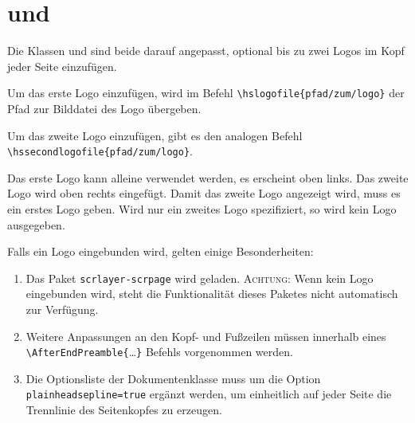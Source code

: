 \section{\HSKLarticle und \HSKLreport}
Die Klassen \HSKLarticle und \HSKLreport sind beide darauf angepasst,
optional bis zu zwei Logos im Kopf jeder Seite einzufügen.

Um das erste Logo einzufügen, wird im Befehl
\verb!\hslogofile{pfad/zum/logo}! der Pfad zur Bilddatei des Logo übergeben.

Um das zweite Logo einzufügen, gibt es den analogen Befehl\\
\verb!\hssecondlogofile{pfad/zum/logo}!.

Das erste Logo kann alleine verwendet werden, es erscheint oben links. Das
zweite Logo wird oben rechts eingefügt. Damit das zweite Logo angezeigt wird,
muss es ein erstes Logo geben. Wird nur ein zweites Logo spezifiziert, so wird
kein Logo ausgegeben.

Falls ein Logo eingebunden wird, gelten einige Besonderheiten:
\begin{enumerate}
	\item Das Paket \verb!scrlayer-scrpage! wird geladen. \textsc{Achtung:} Wenn
	kein Logo eingebunden wird, steht die Funktionalität dieses Paketes nicht
	automatisch zur Verfügung.
	\item Weitere Anpassungen an den Kopf- und Fußzeilen müssen innerhalb eines\\ \verb!\AfterEndPreamble{!\dots\verb!}! Befehls vorgenommen werden.
	\item Die Optionsliste der Dokumentenklasse muss um die Option
	\verb!plainheadsepline=true! ergänzt werden, um einheitlich auf jeder Seite
	die Trennlinie des Seitenkopfes zu erzeugen.
\end{enumerate}
